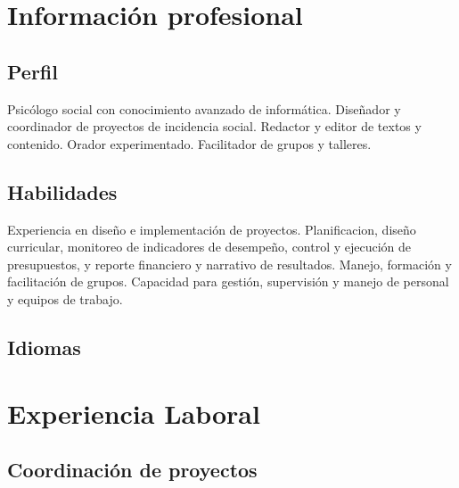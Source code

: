 \documentclass[xcolor=svgnames,color=DarkSlateGray,style=classic]{komacv}
\begin{document}
\maketitle

\section{Información profesional}
\subsection{Perfil}
\raggedright
  Psicólogo social con conocimiento avanzado de informática. Diseñador y coordinador de proyectos de incidencia social. Redactor y editor de textos y contenido. Orador experimentado. Facilitador de grupos y talleres.
\subsection{Habilidades}
\raggedright
  Experiencia en diseño e implementación de proyectos. Planificacion, diseño curricular, monitoreo de indicadores de desempeño, control y ejecución de presupuestos, y reporte financiero y narrativo de resultados. Manejo, formación y facilitación de grupos. Capacidad para gestión, supervisión y manejo de personal y equipos de trabajo.

\subsection{Idiomas}

\section{Experiencia Laboral}
\subsection{Coordinación de proyectos}
\end{document}
